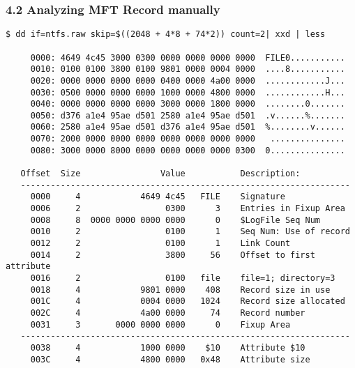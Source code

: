 \begin{frame}[fragile]
  \frametitle{4.2 Analyzing MFT Record manually}
  \begin{lstlisting}[basicstyle=\tiny]
$ dd if=ntfs.raw skip=$((2048 + 4*8 + 74*2)) count=2| xxd | less

     0000: 4649 4c45 3000 0300 0000 0000 0000 0000  FILE0...........
     0010: 0100 0100 3800 0100 9801 0000 0004 0000  ....8...........
     0020: 0000 0000 0000 0000 0400 0000 4a00 0000  ............J...
     0030: 0500 0000 0000 0000 1000 0000 4800 0000  ............H...
     0040: 0000 0000 0000 0000 3000 0000 1800 0000  ........0.......
     0050: d376 a1e4 95ae d501 2580 a1e4 95ae d501  .v......%.......
     0060: 2580 a1e4 95ae d501 d376 a1e4 95ae d501  %........v......
     0070: 2000 0000 0000 0000 0000 0000 0000 0000   ...............
     0080: 3000 0000 8000 0000 0000 0000 0000 0300  0...............

   Offset  Size                Value           Description:
   ------------------------------------------------------------------
     0000     4            4649 4c45   FILE    Signature
     0006     2                 0300      3    Entries in Fixup Area
     0008     8  0000 0000 0000 0000      0    $LogFile Seq Num
     0010     2                 0100      1    Seq Num: Use of record
     0012     2                 0100      1    Link Count
     0014     2                 3800     56    Offset to first attribute
     0016     2                 0100   file    file=1; directory=3
     0018     4            9801 0000    408    Record size in use
     001C     4            0004 0000   1024    Record size allocated
     002C     4            4a00 0000     74    Record number
     0031     3       0000 0000 0000      0    Fixup Area
   ------------------------------------------------------------------
     0038     4            1000 0000    $10    Attribute $10
     003C     4            4800 0000   0x48    Attribute size
  \end{lstlisting}
\end{frame}


